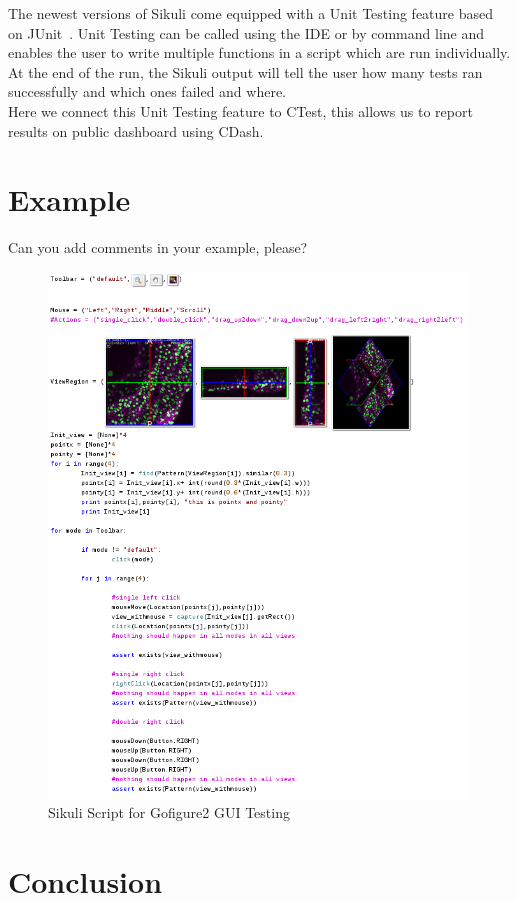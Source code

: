 \documentclass{InsightArticle}
\begin{document}
The newest versions of Sikuli come equipped with a Unit Testing feature based
on JUnit~\cite{}. Unit Testing can be called using the IDE or by command
line and enables the user to write multiple functions in a script which are
run individually. At the end of the run, the Sikuli output will tell the user
how many tests ran successfully and which ones failed and where.\\

Here we connect this Unit Testing feature to CTest, this allows us to report
results on public dashboard using CDash.


\section{Example}

Can you add comments in your example, please?

\begin{figure}[htp]
 \centering
 \includegraphics[width=0.99\textwidth]{Images/Gofigure2Example.png}
 \caption{Sikuli Script for Gofigure2 GUI Testing}
 \label{fig:Gofigure2Example}
\end{figure}
\section{Conclusion}

\clearpage



\end{document}
